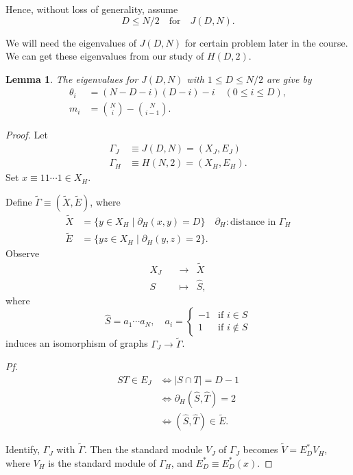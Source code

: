 \documentclass[
]{book}
\newtheorem{lemma}{Lemma}[chapter]
\theoremstyle{definition}
\theoremstyle{definition}
\theoremstyle{definition}
\theoremstyle{definition}
\theoremstyle{remark}
\begin{document}
Hence, without loss of generality, assume
\[D\leq N/2 \quad \text{for} \quad J(D,N).\]

We will need the eigenvalues of \(J(D,N)\) for certain problem later in the course. We can get these eigenvalues from our study of \(H(D,2)\).

\begin{lemma}
\protect\hypertarget{lem:ev-johnson}{}\label{lem:ev-johnson}The eigenvalues for \(J(D,N)\) with \(1\leq D \leq N/2\) are give by
\begin{align}
\theta_i & = (N-D-i)(D-i) - i \quad (0\leq i\leq D),\\
m_i & = \binom{N}{i} - \binom{N}{i-1}.
\end{align}
\end{lemma}

\begin{proof}
Let
\begin{align}
\Gamma_J & \equiv J(D,N) = (X_J, E_J)\\
\Gamma_H & \equiv H(N,2) = (X_H, E_H).
\end{align}
Set \(x \equiv 11\cdots 1 \in X_H\).

Define \(\tilde{\Gamma} \equiv (\tilde{X}, \tilde{E})\), where
\begin{align}
\tilde{X} & = \{y\in X_H \mid \partial_H(x,y) = D\} \quad \partial_H:\text{distance in }\Gamma_H\\
\tilde{E} & = \{yz\in X_H \mid \partial_H(y,z) = 2\}.
\end{align}
Observe
\begin{align}
X_J & \quad \to & \tilde{X}\\
S & \quad \mapsto & \hat{S},
\end{align}
where
\[\hat{S} = a_1\cdots a_N, \quad a_i = \begin{cases} -1 & \text{if }i\in S\\ 1 & \text{if }i\not\in S \end{cases}\]
induces an isomorphism of graphs \(\Gamma_J \to \tilde{\Gamma}\).

\emph{Pf.}
\begin{align}
ST \in E_J &\Leftrightarrow |S\cap T| = D-1\\
& \Leftrightarrow \partial_H(\hat{S}, \hat{T}) = 2\\
& \Leftrightarrow (\hat{S}, \hat{T})\in \tilde{E}.
\end{align}

Identify, \(\Gamma_J\) with \(\tilde{\Gamma}\). Then the standard module \(V_J\) of \(\Gamma_J\) becomes \(\tilde{V} = E^*_DV_H\), where \(V_H\) is the standard module of \(\Gamma_H\), and \(E^*_D \equiv E^*_D(x)\).


\end{proof}
\end{document}
